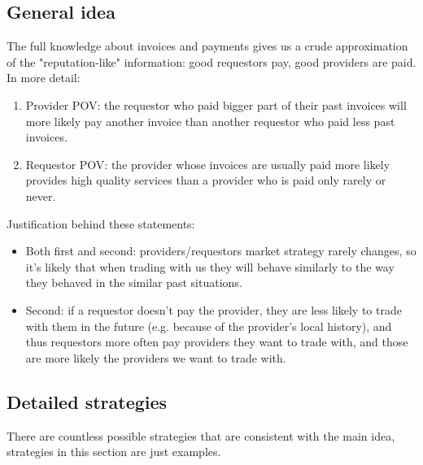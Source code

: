 \documentclass{article}
\begin{document}
\subsection{General idea}

The full knowledge about invoices and payments gives us a crude approximation of the "reputation-like" information: 
good requestors pay, good providers are paid. In more detail:
\begin{enumerate}
    \item Provider POV: the requestor who paid bigger part of their past invoices will more likely pay another invoice than another requestor
        who paid less past invoices.
    \item Requestor POV: the provider whose invoices are usually paid more likely provides high quality services than a provider who is paid
        only rarely or never.
\end{enumerate}

Justification behind these statements:
\begin{itemize}
    \item Both first and second: providers/requestors market strategy rarely changes, so it's likely that when trading with us
        they will behave similarly to the way they behaved in the similar past situations.
    \item Second: if a requestor doesn't pay the provider, they are less likely to trade with them in the future (e.g. because of the provider's local history), 
        and thus requestors more often pay providers they want to trade with, and those are more likely the providers we want to trade with.
\end{itemize}

\subsection{Detailed strategies}

There are countless possible strategies that are consistent with the main idea, strategies in this section are just examples.
\end{document}
